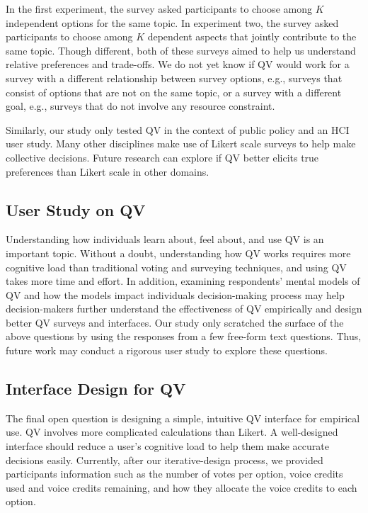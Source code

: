 In the first experiment, the survey asked participants to choose among $K$ independent options for the same topic. In experiment two, the survey asked participants to choose among $K$ dependent aspects that jointly contribute to the same topic. Though different, both of these surveys aimed to help us understand relative preferences and trade-offs. We do not yet know if QV would work for a survey with a different relationship between survey options, e.g., surveys that consist of options that are not on the same topic, or a survey with a different goal, e.g., surveys that do not involve any resource constraint.

Similarly, our study only tested QV in the context of public policy and an HCI user study. Many other disciplines make use of Likert scale surveys to help make collective decisions. Future research can explore if QV better elicits true preferences than Likert scale in other domains.


\subsection{User Study on QV}
Understanding how individuals learn about, feel about, and use QV is an important topic. Without a doubt, understanding how QV works requires more cognitive load than traditional voting and surveying techniques, and using QV takes more time and effort. In addition, examining respondents' mental models of QV and how the models impact individuals decision-making process may help decision-makers further understand the effectiveness of QV empirically and design better QV surveys and interfaces. Our study only scratched the surface of the above questions by using the responses from a few free-form text questions. Thus, future work may conduct a rigorous user study to explore these questions.

\subsection{Interface Design for QV}
The final open question is designing a simple, intuitive QV interface for empirical use. QV involves more complicated calculations than Likert. A well-designed interface should reduce a user's cognitive load to help them make accurate decisions easily. Currently, after our iterative-design process, we provided participants information such as the number of votes per option, voice credits used and voice credits remaining, and how they allocate the voice credits to each option. 

